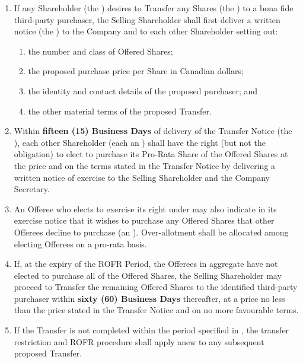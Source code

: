 \begin{enumerate}[leftmargin=*, label=\textbf{6.\arabic*.}, itemsep=5pt]
  \item If any Shareholder (the ) desires to Transfer
        any Shares (the ) to a bona fide third-party
        purchaser, the Selling Shareholder shall first deliver a written notice
        (the ) to the Company and to each other Shareholder
        setting out:
        \begin{enumerate}[label=\lbrack\alph*\rbrack, leftmargin=2em, itemsep=2pt]
          \item the number and class of Offered Shares;
          \item the proposed purchase price per Share in Canadian dollars;
          \item the identity and contact details of the proposed purchaser; and
          \item the other material terms of the proposed Transfer.
        \end{enumerate}

  \item Within \textbf{fifteen (15) Business Days} of delivery of the Transfer
        Notice (the ), each other Shareholder (each an
        ) shall have the right (but not the obligation) to elect
        to purchase its Pro-Rata Share of the Offered Shares at the price and on
        the terms stated in the Transfer Notice by delivering a written notice of
        exercise to the Selling Shareholder and the Company Secretary.

  \item An Offeree who elects to exercise its right under  may also
        indicate in its exercise notice that it wishes to purchase any Offered
        Shares that other Offerees decline to purchase (an ).  Over-allotment shall be allocated among electing Offerees on a
        pro-rata basis.

  \item If, at the expiry of the ROFR Period, the Offerees in aggregate have not
        elected to purchase all of the Offered Shares, the Selling Shareholder may
        proceed to Transfer the remaining Offered Shares to the identified
        third-party purchaser within \textbf{sixty (60) Business Days} thereafter,
        at a price no less than the price stated in the Transfer Notice and on no
        more favourable terms.

  \item If the Transfer is not completed within the period specified in
        , the transfer restriction and ROFR procedure shall apply anew
        to any subsequent proposed Transfer.
\end{enumerate}


